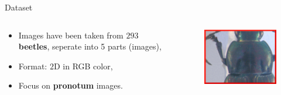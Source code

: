 \documentclass[10pt]{beamer}
\begin{document}
\begin{frame}[c]{Dataset}
	\begin{columns}
		\begin{column}{0.5\textwidth}
			\begin{itemize}
    			\item Images have been taken from $293$ \textbf{beetles}, seperate into 5 parts (images),
    			\item Format: $2$D in RGB color,
    			\item Focus on \textbf{\color{red}pronotum} images.
  			\end{itemize}
		\end{column}
		\begin{column}{0.5\textwidth}  %
    		\begin{center}
     			\begin{figure}[htbp]
        			\centering
        			\includegraphics[scale=1]{images/pronotum}
    				\label{figrsexample1}
				\end{figure}
     		\end{center}
		\end{column}
	\end{columns}~\\
	\begin{figure}[htbp]
   				\begin{subfigure}[t]{0.22\textwidth}
        			\centering

\end{subfigure}
\end{figure}
\end{frame}
\end{document}
